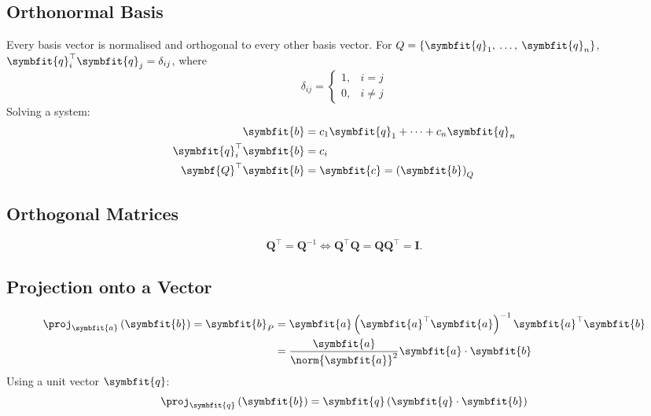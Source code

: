 \documentclass{article}
\begin{document}
\begin{multicols*}{3}
    \subsection{Orthonormal Basis}
    Every basis vector is normalised and orthogonal to every other basis vector.
    For \(Q = \left\{ \symbfit{q}_1,\: \dots,\: \symbfit{q}_n \right\}\),
    \(\symbfit{q}_i^\top \symbfit{q}_j = \delta_{ij}\), where
    \begin{equation*}
        \delta_{ij} = \begin{cases}
            1, & i = j   \\
            0, & i \ne j
        \end{cases}
    \end{equation*}
    Solving a system:
    \begin{align*}
        \symbfit{b}                    & = c_1 \symbfit{q}_1 + \cdots + c_n \symbfit{q}_n \\
        \symbfit{q}_i^\top \symbfit{b} & = c_i                                            \\
        \symbf{Q}^\top \symbfit{b}     & = \symbfit{c} = \left( \symbfit{b} \right)_Q
    \end{align*}
    \subsection{Orthogonal Matrices}
    \begin{equation*}
        \symbf{Q}^\top = \symbf{Q}^{-1}
        \iff
        \symbf{Q}^\top \symbf{Q} = \symbf{Q}\symbf{Q}^\top = \symbf{I}.
    \end{equation*}
    \subsection{Projection onto a Vector}
    \begin{align*}
        \proj_{\symbfit{a}} \left( \symbfit{b} \right) = \symbfit{b}_P & = \symbfit{a} \left( \symbfit{a}^\top \symbfit{a} \right)^{-1} \symbfit{a}^\top \symbfit{b} \\
                                                                       & = \frac{\symbfit{a}}{\norm{\symbfit{a}}^2} \symbfit{a} \cdot \symbfit{b}
    \end{align*}
    Using a unit vector \(\symbfit{q}\):
    \begin{equation*}
        \proj_{\symbfit{q}} \left( \symbfit{b} \right) = \symbfit{q} \left( \symbfit{q} \cdot \symbfit{b} \right)
    \end{equation*}

\end{multicols*}
\end{document}
